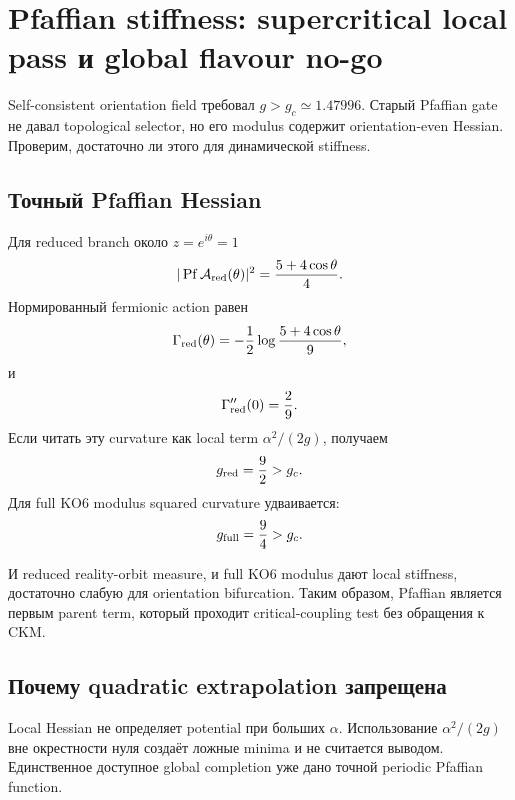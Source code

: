 \chapter{Pfaffian stiffness: supercritical local pass и global flavour no-go}

Self-consistent orientation field требовал \(g>g_c\simeq1.47996\). Старый
Pfaffian gate не давал topological selector, но его modulus содержит
orientation-even Hessian. Проверим, достаточно ли этого для динамической
stiffness.

\section{Точный Pfaffian Hessian}

Для reduced branch около \(z=e^{i\theta}=1\)
\begin{equation}
 |\operatorname{Pf}\mathcal A_{\rm red}(\theta)|^2
 =\frac{5+4\cos\theta}{4}.
\end{equation}
Нормированный fermionic action равен
\begin{equation}
 \Gamma_{\rm red}(\theta)
 =-\frac12\log\frac{5+4\cos\theta}{9},
\end{equation}
и
\begin{equation}
 \Gamma_{\rm red}''(0)=\frac29.
\end{equation}
Если читать эту curvature как local term \(\alpha^2/(2g)\), получаем
\begin{equation}
 g_{\rm red}=\frac92>g_c.
\end{equation}
Для full KO6 modulus squared curvature удваивается:
\begin{equation}
 g_{\rm full}=\frac94>g_c.
\end{equation}

\begin{proposition}
И reduced reality-orbit measure, и full KO6 modulus дают local stiffness,
достаточно слабую для orientation bifurcation. Таким образом, Pfaffian
является первым parent term, который проходит critical-coupling test без
обращения к CKM.
\end{proposition}

\section{Почему quadratic extrapolation запрещена}

Local Hessian не определяет potential при больших \(\alpha\). Использование
\(\alpha^2/(2g)\) вне окрестности нуля создаёт ложные minima и не считается
выводом. Единственное доступное global completion уже дано точной periodic
Pfaffian function.

